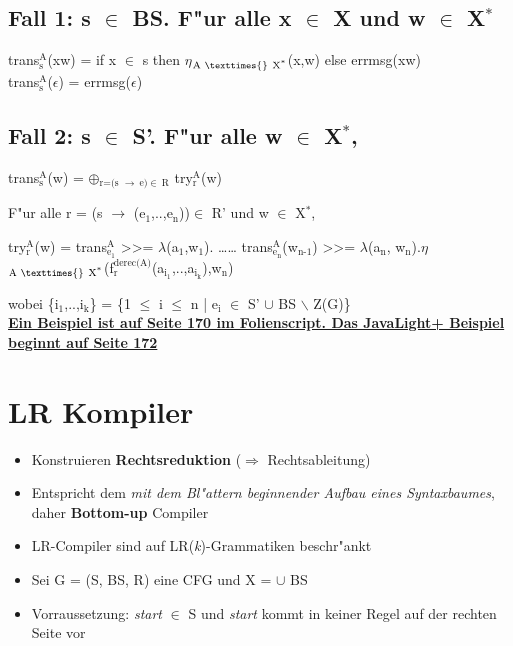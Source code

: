 \documentclass[11pt]{article}
\begin{document}
\subsection{Fall 1: s $\in$ BS. F"ur alle x $\in$ X und w $\in$ X$^{\text{*}}$}
\label{sec-6-1}

\begin{center}
trans$_{\text{s}}^{\text{A}}$(xw) = if x $\in$ s then $\eta$$_{\text{A }\texttimes{}\ \text{X}^{\text{*}}}$(x,w) else errmsg(xw) \\
trans$_{\text{s}}^{\text{A}}$($\epsilon$) = errmsg($\epsilon$)
\end{center}

\subsection{Fall 2: s $\in$ S'. F"ur alle w $\in$ X$^{\text{*}}$,}
\label{sec-6-2}

\begin{center}
trans$_{\text{s}}^{\text{A}}$(w) = $\oplus$$_{\text{r=(s }\to\ \text{e)}\in\ \text{R}}$ try$_{\text{r}}^{\text{A}}$(w)
\end{center}


F"ur alle r = (s $\to$ (e$_{\text{1}}$,..,e$_{\text{n}}$))$\in$ R' und w $\in$ X$^{\text{*}}$,
\begin{center}
try$_{\text{r}}^{\text{A}}$(w) = trans$_{\text{e}_{\text{1}}}^{\text{A}}$ >>= $\lambda$(a$_{\text{1}}$,w$_{\text{1}}$). \ldots{}\ldots{} trans$_{\text{e}_{\text{n}}}^{\text{A}}$(w$_{\text{n-1}}$) >>= $\lambda$(a$_{\text{n}}$, w$_{\text{n}}$).$\eta$$_{\text{A }\texttimes{}\ \text{X}^{\text{*}}}$(f$_{\text{r}}^{\text{derec(A)}}$(a$_{\text{i}_{\text{1}}}$,..,a$_{\text{i}_{\text{k}}}$),w$_{\text{n}}$)
\end{center}
wobei \{i$_{\text{1}}$,..,i$_{\text{k}}$\} = \{1 $\le$ i $\le$ n | e$_{\text{i}}$ $\in$ S' $\cup$ BS $\backslash$ Z(G)\} \\


\textbf{\uline{Ein Beispiel ist auf Seite 170 im Folienscript. Das JavaLight+ Beispiel beginnt auf Seite 172}} 

\section{LR Kompiler}
\label{sec-7}

\begin{itemize}
\item Konstruieren \textbf{Rechtsreduktion} ($\Rightarrow$ Rechtsableitung)
\item Entspricht dem \emph{mit dem Bl"attern beginnender Aufbau eines Syntaxbaumes}, daher \textbf{Bottom-up} Compiler
\item LR-Compiler sind auf LR(\emph{k})-Grammatiken beschr"ankt
\item Sei G = (S, BS, R) eine CFG und X = $\cup$ BS
\item Vorraussetzung: \emph{start} $\in$ S und \emph{start} kommt in keiner Regel auf der rechten Seite vor
\end{itemize}
\end{document}
